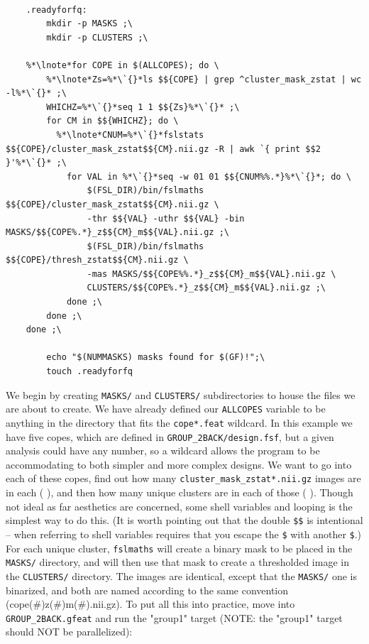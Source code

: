 \begin{lstlisting}

	.readyforfq:
		mkdir -p MASKS ;\
		mkdir -p CLUSTERS ;\
		
	%*\lnote*for COPE in $(ALLCOPES); do \
		%*\lnote*Zs=%*\`{}*ls $${COPE} | grep ^cluster_mask_zstat | wc -l%*\`{}* ;\
		WHICHZ=%*\`{}*seq 1 1 $${Zs}%*\`{}* ;\
		for CM in $${WHICHZ}; do \
		  %*\lnote*CNUM=%*\`{}*fslstats $${COPE}/cluster_mask_zstat$${CM}.nii.gz -R | awk `{ print $$2 }'%*\`{}* ;\
		  	for VAL in %*\`{}*seq -w 01 01 $${CNUM%%.*}%*\`{}*; do \
				$(FSL_DIR)/bin/fslmaths $${COPE}/cluster_mask_zstat$${CM}.nii.gz \
				-thr $${VAL} -uthr $${VAL} -bin MASKS/$${COPE%.*}_z$${CM}_m$${VAL}.nii.gz ;\
				$(FSL_DIR)/bin/fslmaths $${COPE}/thresh_zstat$${CM}.nii.gz \
				-mas MASKS/$${COPE%%.*}_z$${CM}_m$${VAL}.nii.gz \
				CLUSTERS/$${COPE%.*}_z$${CM}_m$${VAL}.nii.gz ;\
			done ;\
		done ;\
	done ;\
		
		echo "$(NUMMASKS) masks found for $(GF)!";\
		touch .readyforfq
\end{lstlisting}

We begin by creating \texttt{MASKS/} and \texttt{CLUSTERS/} subdirectories to house the files we are about to create.  We have already defined our \texttt{ALLCOPES} variable to be anything in the directory that fits the \texttt{cope*.feat} wildcard. In this example we have five copes, which are defined in \texttt{GROUP_2BACK/design.fsf}, but a given analysis could have any number, so a wildcard allows the program to be accommodating to both simpler and more complex designs.  We want \maken{} to go into each of these copes, find out how many \texttt{cluster_mask_zstat*.nii.gz} images are in each ( ), and then how many unique clusters are in each of those ( ). Though not ideal as far aesthetics are concerned, some shell variables and looping is the simplest way to do this.  (It is worth pointing out that the double \texttt{\$\$} is intentional -- when referring to shell variables \maken{} requires that you escape the \texttt{\$} with another \texttt{\$}.) For each unique cluster, \texttt{fslmaths} will create a binary mask to be placed in the \texttt{MASKS/} directory, and will then use that mask to create a thresholded image in the \texttt{CLUSTERS/} directory. The images are identical, except that the \texttt{MASKS/} one is binarized, and both are named according to the same convention (cope(\#)z(\#)m(\#).nii.gz). To put all this into practice, move into \texttt{GROUP_2BACK.gfeat} and run the "group1" target (NOTE: the "group1" target should NOT be parallelized):

